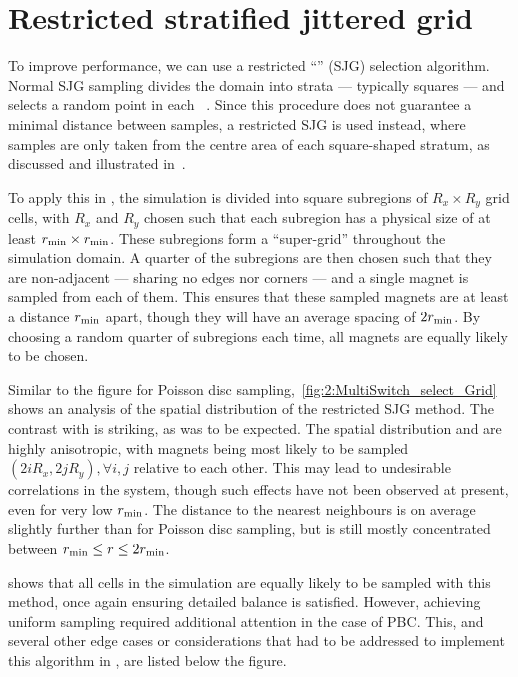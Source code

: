 \section{Restricted stratified jittered grid}
To improve performance, we can use a restricted ``'' (SJG) selection algorithm.
Normal SJG sampling divides the domain into strata --- typically squares --- and selects a random point in each ~\cite{ProgressiveMultiJittered}.
Since this procedure does not guarantee a minimal distance between samples, a restricted SJG is used instead, where samples are only taken from the centre area of each square-shaped stratum, as discussed and illustrated in~. \par %
To apply this in \hotspice, the simulation is divided into square subregions of $R_x \times R_y$ grid cells, with $R_x$ and $R_y$ chosen such that each subregion has a physical size of at least $r_\mathrm{min} \times r_\mathrm{min}$.
These subregions form a ``super-grid'' throughout the simulation domain.
A quarter of the subregions are then chosen such that they are non-adjacent --- sharing no edges nor corners --- and a single magnet is sampled from each of them. %
This ensures that these sampled magnets are at least a distance $r_\mathrm{min}$ apart, though they will have an average spacing of $2r_\mathrm{min}$.
By choosing a random quarter of subregions each time, all magnets are equally likely to be chosen. \\\par

Similar to the figure for Poisson disc sampling,~\cref{fig:2:MultiSwitch_select_Grid} shows an analysis of the spatial distribution of the restricted SJG method.
The contrast with  is striking, as was to be expected.
The spatial distribution and  are highly anisotropic, with magnets being most likely to be sampled $(2iR_x, 2jR_y), \forall i,j$ relative to each other.
This may lead to undesirable correlations in the system, though such effects have not been observed at present, even for very low $r_\mathrm{min}$.
The distance to the nearest neighbours is on average slightly further than for Poisson disc sampling, but is still mostly concentrated between $r_\mathrm{min} \leq r \leq 2r_\mathrm{min}$. \par
{} shows that all cells in the simulation are equally likely to be sampled with this method, once again ensuring detailed balance is satisfied.
However, achieving uniform sampling required additional attention in the case of PBC.
This, and several other edge cases or considerations that had to be addressed to implement this algorithm in \hotspice, are listed below the figure.

